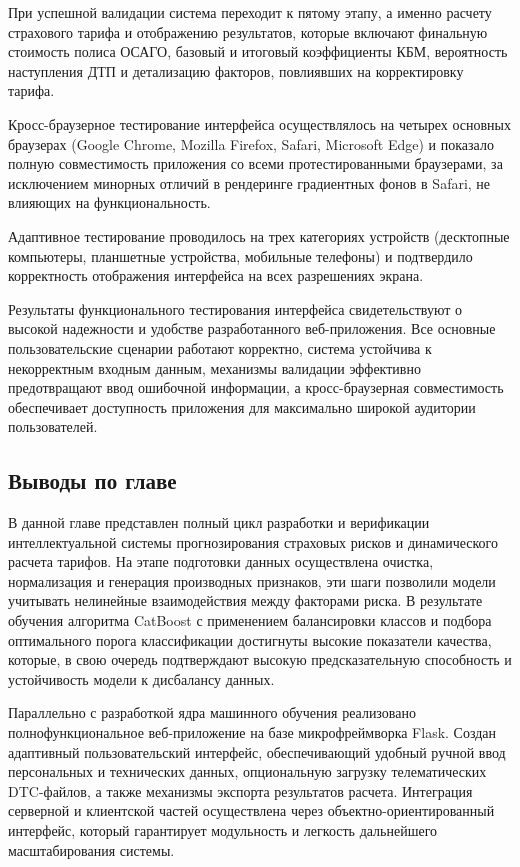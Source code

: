 При успешной валидации система переходит к пятому этапу, а именно расчету страхового тарифа и отображению результатов, которые включают финальную стоимость полиса ОСАГО, базовый и итоговый коэффициенты КБМ, вероятность наступления ДТП и детализацию факторов, повлиявших на корректировку тарифа.

Кросс-браузерное тестирование интерфейса осуществлялось на четырех основных браузерах (Google Chrome, Mozilla Firefox, Safari, Microsoft Edge) и показало полную совместимость приложения со всеми протестированными браузерами, за исключением минорных отличий в рендеринге градиентных фонов в Safari, не влияющих на функциональность.

Адаптивное тестирование проводилось на трех категориях устройств (десктопные компьютеры, планшетные устройства, мобильные телефоны) и подтвердило корректность отображения интерфейса на всех разрешениях экрана.

Результаты функционального тестирования интерфейса свидетельствуют о высокой надежности и удобстве разработанного веб-приложения. Все основные пользовательские сценарии работают корректно, система устойчива к некорректным входным данным, механизмы валидации эффективно предотвращают ввод ошибочной информации, а кросс-браузерная совместимость обеспечивает доступность приложения для максимально широкой аудитории пользователей.

\subsection{Выводы по главе}

В данной главе представлен полный цикл разработки и верификации интеллектуальной системы прогнозирования страховых рисков и динамического расчета тарифов. На этапе подготовки данных осуществлена очистка, нормализация и генерация производных признаков, эти шаги позволили модели учитывать нелинейные взаимодействия между факторами риска. В результате обучения алгоритма CatBoost с применением балансировки классов и подбора оптимального порога классификации достигнуты высокие показатели качества, которые, в свою очередь подтверждают высокую предсказательную способность и устойчивость модели к дисбалансу данных.

Параллельно с разработкой ядра машинного обучения реализовано полнофункциональное веб-приложение на базе микрофреймворка Flask. Создан адаптивный пользовательский интерфейс, обеспечивающий удобный ручной ввод персональных и технических данных, опциональную загрузку телематических DTC-файлов, а также механизмы экспорта результатов расчета. Интеграция серверной и клиентской частей осуществлена через объектно-ориентированный интерфейс, который гарантирует модульность и легкость дальнейшего масштабирования системы.

